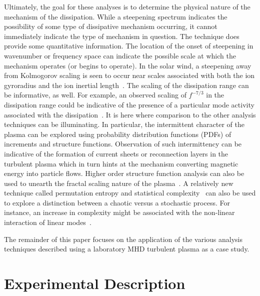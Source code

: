 \documentclass[aip,pop,amsmath,amssymb,preprint,superscriptaddress]{revtex4-1} %
\begin{document}
Ultimately, the goal for these analyses is to determine the physical nature of the mechanism of the dissipation. While a steepening spectrum indicates the possibility of some type of dissipative mechanism occurring, it cannot immediately indicate the type of mechanism in question. The technique does provide some quantitative information. The location of the onset of steepening in wavenumber or frequency space can indicate the possible scale at which the mechanism operates (or begins to operate). In the solar wind, a steepening away from Kolmogorov scaling is seen to occur near scales associated with both the ion gyroradius and the ion inertial length~\cite{chen2014}. The scaling of the dissipation range can be informative, as well. For example, an observed scaling of $f^{-7/3}$ in the dissipation range could be indicative of the presence of a particular mode activity associated with the dissipation~\cite{shaikh2009}. It is here where comparison to the other analysis techniques can be illuminating. In particular, the intermittent character of the plasma can be explored using probability distribution functions (PDFs) of increments and structure functions. Observation of such intermittency can be indicative of the formation of current sheets or reconnection layers in the turbulent plasma which in turn hints at the mechanism converting magnetic energy into particle flows. Higher order structure function analysis can also be used to unearth the fractal scaling nature of the plasma~\cite{schaffner2015}. A relatively new technique called permutation entropy and statistical complexity~\cite{rosso2007} can also be used to explore a distinction between a chaotic versus a stochastic process. For instance, an increase in complexity might be associated with the non-linear interaction of linear modes~\cite{maggs2013,maggs2015}.

The remainder of this paper focuses on the application of the various analysis techniques described using a laboratory MHD turbulent plasma as a case study.

\section{Experimental Description}
\end{document}
